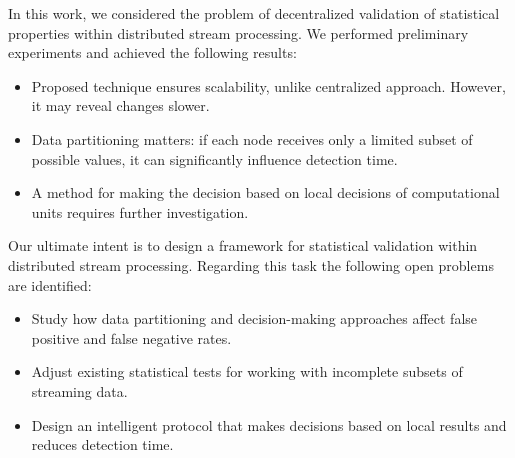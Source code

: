 \label {fs-short-conclusion}

In this work, we considered the problem of decentralized validation of statistical properties within distributed stream processing. We performed preliminary experiments and achieved the following results:
\begin{itemize}
    \item Proposed technique ensures scalability, unlike centralized approach. However, it may reveal changes slower.
    \item Data partitioning matters: if each node receives only a limited subset of possible values, it can significantly influence detection time.
    \item A method for making the decision based on local decisions of computational units requires further investigation.
\end{itemize}

Our ultimate intent is to design a framework for statistical validation within distributed stream processing. Regarding this task the following open problems are identified:

\begin{itemize}
    \item Study how data partitioning and decision-making approaches affect false positive and false negative rates.
    \item Adjust existing statistical tests for working with incomplete subsets of streaming data.
    \item Design an intelligent protocol that makes decisions based on local results and reduces detection time.
\end{itemize}